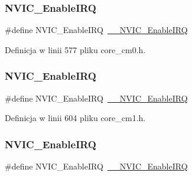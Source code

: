 \subsubsection{\texorpdfstring{N\+V\+I\+C\+\_\+\+Enable\+I\+RQ}{NVIC\_EnableIRQ}\hspace{0.1cm}{\footnotesize\ttfamily [1/12]}}
{\footnotesize\ttfamily \#define N\+V\+I\+C\+\_\+\+Enable\+I\+RQ~\hyperlink{group___c_m_s_i_s___core___n_v_i_c_functions_ga71227e1376cde11eda03fcb62f1b33ea}{\+\_\+\+\_\+\+N\+V\+I\+C\+\_\+\+Enable\+I\+RQ}}



Definicja w linii 577 pliku core\+\_\+cm0.\+h.

\mbox{\label{group___c_m_s_i_s___core___n_v_i_c_functions_ga57b3064413dbc7459d9646020fdd8bef}} 
\subsubsection{\texorpdfstring{N\+V\+I\+C\+\_\+\+Enable\+I\+RQ}{NVIC\_EnableIRQ}\hspace{0.1cm}{\footnotesize\ttfamily [2/12]}}
{\footnotesize\ttfamily \#define N\+V\+I\+C\+\_\+\+Enable\+I\+RQ~\hyperlink{group___c_m_s_i_s___core___n_v_i_c_functions_ga71227e1376cde11eda03fcb62f1b33ea}{\+\_\+\+\_\+\+N\+V\+I\+C\+\_\+\+Enable\+I\+RQ}}



Definicja w linii 604 pliku core\+\_\+cm1.\+h.

\mbox{\label{group___c_m_s_i_s___core___n_v_i_c_functions_ga57b3064413dbc7459d9646020fdd8bef}} 
\subsubsection{\texorpdfstring{N\+V\+I\+C\+\_\+\+Enable\+I\+RQ}{NVIC\_EnableIRQ}\hspace{0.1cm}{\footnotesize\ttfamily [3/12]}}
{\footnotesize\ttfamily \#define N\+V\+I\+C\+\_\+\+Enable\+I\+RQ~\hyperlink{group___c_m_s_i_s___core___n_v_i_c_functions_ga71227e1376cde11eda03fcb62f1b33ea}{\+\_\+\+\_\+\+N\+V\+I\+C\+\_\+\+Enable\+I\+RQ}}



